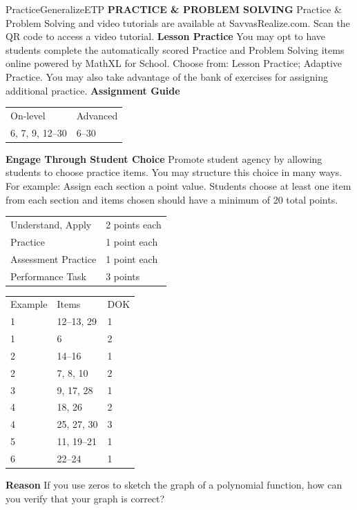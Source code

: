 \documentclass{article}
\newenvironment{item-analysis}{}{}      %
\newenvironment{practice}[2]{}{}        %
\newenvironment{te-addendum}[2]{}{}     %
\newcommand{\answer}[1]{}               %
\begin{document}
\begin{te-addendum}{Practice}{GeneralizeETP}
\textbf{PRACTICE \& PROBLEM SOLVING}
Practice \& Problem Solving and video tutorials are available at SavvasRealize.com.
Scan the QR code to access a video tutorial.
\textbf{Lesson Practice} You may opt to have students complete the automatically scored Practice and Problem Solving items online powered by MathXL for School.
Choose from: Lesson Practice; Adaptive Practice.
You may also take advantage of the bank of exercises for assigning additional practice.
\textbf{Assignment Guide}
\begin{tabular}{ll}
On-level & Advanced \\
6, 7, 9, 12--30 & 6--30 \\
\end{tabular}
\textbf{Engage Through Student Choice}
Promote student agency by allowing students to choose practice items. You may structure this choice in many ways.
For example:
Assign each section a point value. Students choose at least one item from each section and items chosen should have a minimum of 20 total points.
\begin{tabular}{ll}
Understand, Apply & 2 points each \\
Practice & 1 point each \\
Assessment Practice & 1 point each \\
Performance Task & 3 points \\
\end{tabular}
\end{te-addendum}
\begin{item-analysis}
\begin{tabular}{lll}
Example & Items & DOK \\
1 & 12--13, 29 & 1 \\
1 & 6 & 2 \\
2 & 14--16 & 1 \\
2 & 7, 8, 10 & 2 \\
3 & 9, 17, 28 & 1 \\
4 & 18, 26 & 2 \\
4 & 25, 27, 30 & 3 \\
5 & 11, 19--21 & 1 \\
6 & 22--24 & 1 \\
\end{tabular}
\end{item-analysis}
\begin{practice}{6}{2}
\textbf{Reason} If you use zeros to sketch the graph of a polynomial function, how can you verify that your graph is correct?
\answer{You can use a graphing calculator to check the sketch.}
\end{practice}
\end{document}
